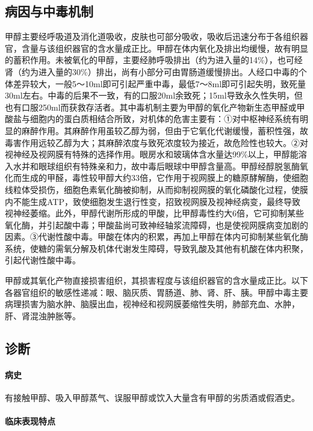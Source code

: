 \subsection{病因与中毒机制}

甲醇主要经呼吸道及消化道吸收，皮肤也可部分吸收，吸收后迅速分布于各组织器官，含量与该组织器官的含水量成正比。甲醇在体内氧化及排出均缓慢，故有明显的蓄积作用。未被氧化的甲醇，主要经肺呼吸排出（约为进入量的14\%），也可经肾（约为进入量的30\%）排出，尚有小部分可由胃肠道缓慢排出。人经口中毒的个体差异较大，一般5～10ml即可引起严重中毒，最低7～8ml即可引起失明，致死量30ml左右。中毒的后果不一致，有的口服20ml余致死；15ml导致永久性失明，但也有口服250ml而获救存活者。其中毒机制主要为甲醇的氧化产物新生态甲醛或甲酸盐与细胞内的蛋白质相结合所致，对机体的危害主要有：①对中枢神经系统有明显的麻醉作用。其麻醉作用虽较乙醇为弱，但由于它氧化代谢缓慢，蓄积性强，故毒害作用远较乙醇为大；其麻醉浓度与致死浓度较为接近，故危险性也较大。②对视神经及视网膜有特殊的选择作用。眼房水和玻璃体含水量达99\%以上，甲醇能溶入水并和眼球组织有特殊亲和力，故中毒后眼球中甲醇含量高。甲醇经醇脱氢酶氧化而生成的甲醛，毒性较甲醇大约33倍，它作用于视网膜上的糖原酵解酶，使细胞线粒体受损伤，细胞色素氧化酶被抑制，从而抑制视网膜的氧化磷酸化过程，使膜内不能生成ATP，致使细胞发生退行性变，招致视网膜及视神经病变，最终导致视神经萎缩。此外，甲醇代谢所形成的甲酸，比甲醇毒性约大6倍，它可抑制某些氧化酶，并引起酸中毒；甲酸盐尚可致神经轴浆流障碍，也是使视网膜病变加剧的因素。③代谢性酸中毒。甲酸在体内的积累，再加上甲醇在体内可抑制某些氧化酶系统，使糖的需氧分解及机体代谢发生障碍，导致乳酸及其他有机酸在体内积聚，引起代谢性酸中毒。

甲醇或其氧化产物直接损害组织，其损害程度与该组织器官的含水量成正比。以下各器官组织的敏感性递减：眼、脑灰质、胃肠道、肺、肾、肝、胰。甲醇中毒主要病理损害为脑水肿、脑膜出血，视神经和视网膜萎缩性失明，肺部充血、水肿，肝、肾混浊肿胀等。

\subsection{诊断}

\paragraph{病史}

有接触甲醇、吸入甲醇蒸气、误服甲醇或饮入大量含有甲醇的劣质酒或假酒史。

\paragraph{临床表现特点}

